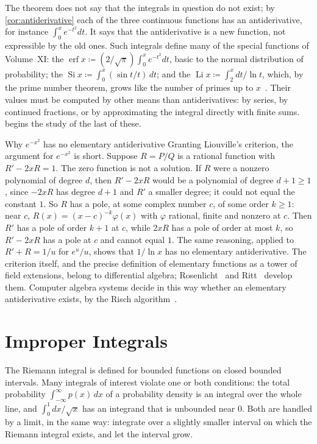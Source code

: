 The theorem does not say that the integrals in question do not exist; by \cref{cor:antiderivative} each of the three continuous functions has an antiderivative, for instance $\int_0^xe^{-t^2}dt$. It says that the antiderivative is a new function, not expressible by the old ones. Such integrals define many of the special functions of Volume~XI: the  $\operatorname{erf}x\coloneqq(2/\sqrt\pi)\int_0^xe^{-t^2}dt$, basic to the normal distribution of probability; the  $\operatorname{Si}x\coloneqq\int_0^x(\sin t/t)\,dt$; and the  $\operatorname{Li}x\coloneqq\int_2^xdt/\ln t$, which, by the prime number theorem, grows like the number of primes up to $x$~\cite{hardywright2008}. Their values must be computed by other means than antiderivatives: by series, by continued fractions, or by approximating the integral directly with finite sums.  begins the study of the last of these.

\begin{note}{Why $e^{-x^2}$ has no elementary antiderivative}
Granting Liouville's criterion, the argument for $e^{-x^2}$ is short. Suppose $R=P/Q$ is a rational function with $R'-2xR=1$. The zero function is not a solution. If $R$ were a nonzero polynomial of degree $d$, then $R'-2xR$ would be a polynomial of degree $d+1\ge1$, since $-2xR$ has degree $d+1$ and $R'$ a smaller degree; it could not equal the constant $1$. So $R$ has a pole, at some complex number $c$, of some order $k\ge1$: near $c$, $R(x)=(x-c)^{-k}\varphi(x)$ with $\varphi$ rational, finite and nonzero at $c$. Then $R'$ has a pole of order $k+1$ at $c$, while $2xR$ has a pole of order at most $k$, so $R'-2xR$ has a pole at $c$ and cannot equal $1$. The same reasoning, applied to $R'+R=1/u$ for $e^u/u$, shows that $1/\ln x$ has no elementary antiderivative. The criterion itself, and the precise definition of elementary functions as a tower of field extensions, belong to differential algebra; Rosenlicht~\cite{rosenlicht1972} and Ritt~\cite{ritt1948} develop them. Computer algebra systems decide in this way whether an elementary antiderivative exists, by the Risch algorithm~\cite{bronstein2005}.
\end{note}

\section{Improper Integrals}
\label{sec:improper}

The Riemann integral is defined for bounded functions on closed bounded intervals. Many integrals of interest violate one or both conditions: the total probability $\int_{-\infty}^\infty p(x)\,dx$ of a probability density is an integral over the whole line, and $\int_0^1dx/\sqrt x$ has an integrand that is unbounded near $0$. Both are handled by a limit, in the same way: integrate over a slightly smaller interval on which the Riemann integral exists, and let the interval grow.

